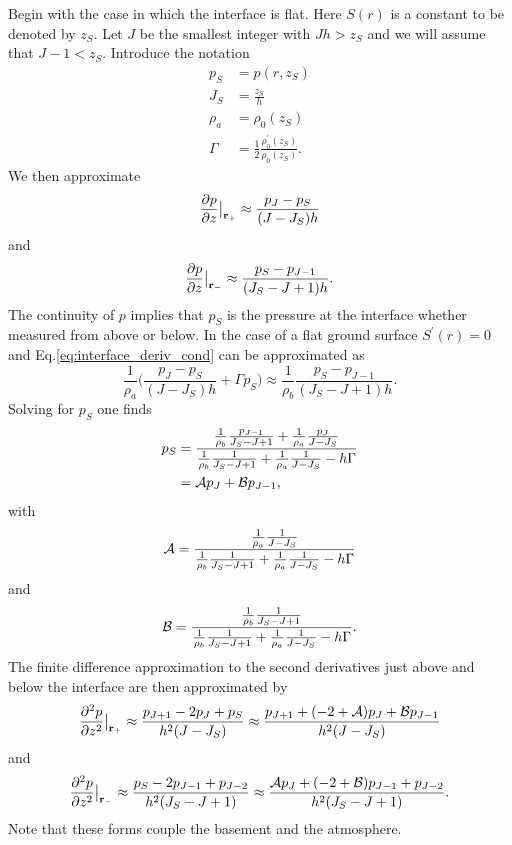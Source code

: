 Begin with the case in which the interface is flat. Here $S(r)$ is a constant to be denoted by $z_S$. Let $J$ be the smallest integer with $Jh>z_S$ and we will assume that $J-1<z_S$. Introduce the notation 
\begin{equation}
\begin{aligned}
p_S &=p(r,z_S)\\
J_S &=\frac{z_S}{h}\\
\rho_a &=\rho_0(z_S)\\
\Gamma &=\frac{1}{2}\frac{\rho_0^\prime(z_S)}{\rho_0(z_S)}.
\end{aligned}
\label{eg_flat_gnd_defs}\end{equation} 
We then approximate 
\[
\frac{\partial p}{\partial z}\big|_{{\bf r}_+}\approx\frac{p_J-p_S}{(J-J_S)h}
\]
and
\[
\frac{\partial p}{\partial z}\big|_{{\bf r}_-}\approx\frac{p_S-p_{J-1}}{(J_S-J+1)h}.
\]
The continuity of $p$ implies that $p_S$ is the pressure at the interface whether measured from above or below. In the case of a flat ground surface $S^\prime(r)=0$ and Eq.\ref{eq:interface_deriv_cond} can be approximated as 
\[
\frac{1}{\rho_a}\Big(\frac{p_J-p_S}{(J-J_S)h}+\Gamma p_S\Big)
\approx
\frac{1}{\rho_b}\frac{p_S-p_{J-1}}{(J_S-J+1)h}.
\]
Solving for $p_S$ one finds 
\[
\begin{aligned}
p_S
&=
\frac{\frac{1}{\rho_b}\frac{p_{J-1}}{J_S-J+1}+\frac{1}{\rho_a}\frac{p_J}{J-J_S}}
{\frac{1}{\rho_b}\frac{1}{J_S-J+1}+\frac{1}{\rho_a}\frac{1}{J-J_S}-h\Gamma}\\
&=
{\cal A}p_J+{\cal B}p_{J-1}, 
\end{aligned}
\]
with
\[
{\cal A}
=
\frac{\frac{1}{\rho_a}\frac{1}{J-J_S}}
{\frac{1}{\rho_b}\frac{1}{J_S-J+1}+\frac{1}{\rho_a}\frac{1}{J-J_S}-h\Gamma}
\]
and
\[
{\cal B}
=
\frac{\frac{1}{\rho_b}\frac{1}{J_S-J+1}}
{\frac{1}{\rho_b}\frac{1}{J_S-J+1}+\frac{1}{\rho_a}\frac{1}{J-J_S}-h\Gamma}.
\]
The finite difference approximation to the second derivatives just above and below the interface are then approximated by
\[
\frac{\partial^2 p}{\partial z^2}\big|_{{\bf r}_+}
\approx\frac{p_{J+1}-2p_J+p_S}{h^2(J-J_S)}
\approx\frac{p_{J+1}+(-2+{\cal A})p_J+{\cal B}p_{J-1}}{h^2(J-J_S)}
\] 
and 
\[
\frac{\partial^2 p}{\partial z^2}\big|_{{\bf r}_-}
\approx\frac{p_S-2p_{J-1}+p_{J-2}}{h^2(J_S-J+1)}
\approx\frac{{\cal A}p_J+(-2+{\cal B})p_{J-1}+p_{J-2}}{h^2(J_S-J+1)}.
\]
Note that these forms couple the basement and the atmosphere. 

